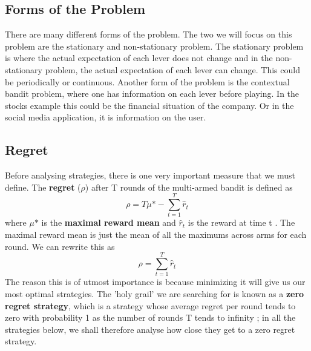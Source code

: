 \subsection{Forms of the Problem}\label{subsec:forms-of-the-problem}
There are many different forms of the problem.
The two we will focus on this problem are the stationary and non-stationary problem.
The stationary problem is where the actual expectation of each lever does not change and in the non-stationary problem, the actual expectation of each lever can change.
This could be periodically or continuous.
Another form of the problem is the contextual bandit problem, where one has information on each lever before playing.
In the stocks example this could be the financial situation of the company.
Or in the social media application, it is information on the user.

\subsection{Regret}\label{subsec:regret}
Before analysing strategies, there is one very important measure that we must define.
The \textbf{regret} ($\rho$) after T rounds of the multi-armed bandit is defined as $$\rho = T\mu\mbox{*} - \sum_{t=1}^T\hat{r}_t$$ where $\mu\mbox{*}$ is the \textbf{maximal reward mean} and $\hat{r}_t$ is the reward at time t \citep{vermorel}.
The maximal reward mean is just the mean of all the maximums across arms for each round.
We can rewrite this as $$\rho = \sum_{t=1}^T\hat{r}_t$$ The reason this is of utmost importance is because minimizing it will give us our most optimal strategies. The 'holy grail' we are searching for is known as a \textbf{zero regret strategy}, which is a strategy whose average regret per round tends to zero with probability 1 as the number of rounds T tends to infinity \citep{vermorel}; in all the strategies below, we shall therefore analyse how close they get to a zero regret strategy.